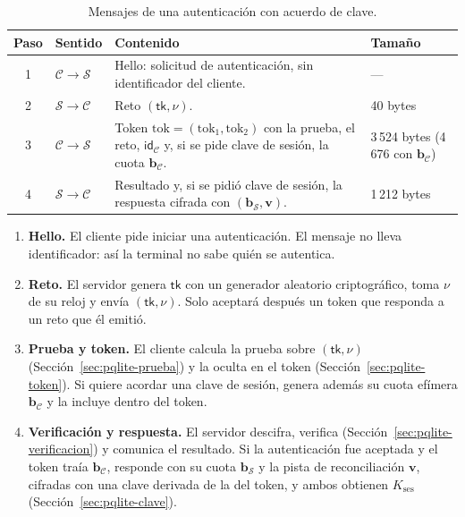 \begin{table}[H]
\centering
\caption{Mensajes de una autenticación con acuerdo de clave.}
\label{tab:pqlite_mensajes}
\small
\begin{tabularx}{\textwidth}{clYl}
\toprule
\textbf{Paso} & \textbf{Sentido} & \textbf{Contenido} & \textbf{Tamaño} \\
 & $\mathcal{C} \to \mathcal{S}$ & \textsf{Hello}: solicitud de autenticación, sin identificador del cliente. & --- \\
2 & $\mathcal{S} \to \mathcal{C}$ & Reto $(\mathsf{tk}, \nu)$. & 40 bytes \\
3 & $\mathcal{C} \to \mathcal{S}$ & Token $\text{tok} = (\text{tok}_1, \text{tok}_2)$ con la prueba, el reto, $\mathsf{id}_{\mathcal{C}}$ y, si se pide clave de sesión, la cuota $\mathbf{b}_{\mathcal{C}}$. & 3\,524 bytes (4\,676 con $\mathbf{b}_{\mathcal{C}}$) \\
4 & $\mathcal{S} \to \mathcal{C}$ & Resultado y, si se pidió clave de sesión, la respuesta cifrada con $(\mathbf{b}_{\mathcal{S}}, \mathbf{v})$. & 1\,212 bytes \\
\bottomrule
\end{tabularx}
\end{table}

\begin{enumerate}
    \item \textbf{Hello.} El cliente pide iniciar una autenticación. El mensaje no lleva identificador: así la terminal no sabe quién se autentica.
    \item \textbf{Reto.} El servidor genera $\mathsf{tk}$ con un generador aleatorio criptográfico, toma $\nu$ de su reloj y envía $(\mathsf{tk}, \nu)$. Solo aceptará después un token que responda a un reto que él emitió.
    \item \textbf{Prueba y token.} El cliente calcula la prueba sobre $(\mathsf{tk}, \nu)$ (Sección~\ref{sec:pqlite-prueba}) y la oculta en el token (Sección~\ref{sec:pqlite-token}). Si quiere acordar una clave de sesión, genera además su cuota efímera $\mathbf{b}_{\mathcal{C}}$ y la incluye dentro del token.
    \item \textbf{Verificación y respuesta.} El servidor descifra, verifica (Sección~\ref{sec:pqlite-verificacion}) y comunica el resultado. Si la autenticación fue aceptada y el token traía $\mathbf{b}_{\mathcal{C}}$, responde con su cuota $\mathbf{b}_{\mathcal{S}}$ y la pista de reconciliación $\mathbf{v}$, cifradas con una clave derivada de la del token, y ambos obtienen $K_{\text{ses}}$ (Sección~\ref{sec:pqlite-clave}).
\end{enumerate}

